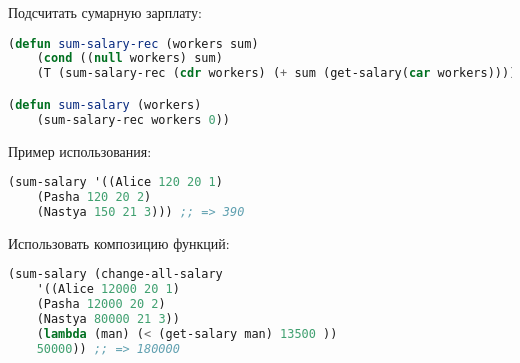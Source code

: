 \documentclass[a4paper,oneside,12pt]{extreport}
\begin{document}
\begin{task}
    Подсчитать сумарную зарплату:
    \begin{lstlisting}[language=Lisp] 
(defun sum-salary-rec (workers sum)
    (cond ((null workers) sum)
    (T (sum-salary-rec (cdr workers) (+ sum (get-salary(car workers))))) ))

(defun sum-salary (workers)
    (sum-salary-rec workers 0))
    \end{lstlisting}

    Пример использования:
    \begin{lstlisting}[language=Lisp] 
(sum-salary '((Alice 120 20 1)
    (Pasha 120 20 2)
    (Nastya 150 21 3))) ;; => 390
    \end{lstlisting}


    Использовать композицию функций:
    \begin{lstlisting}[language=Lisp] 
(sum-salary (change-all-salary 
	'((Alice 12000 20 1)
	(Pasha 12000 20 2)
	(Nastya 80000 21 3))
	(lambda (man) (< (get-salary man) 13500 ))
	50000)) ;; => 180000
    \end{lstlisting}

\end{task}

\newpage
\end{document}
